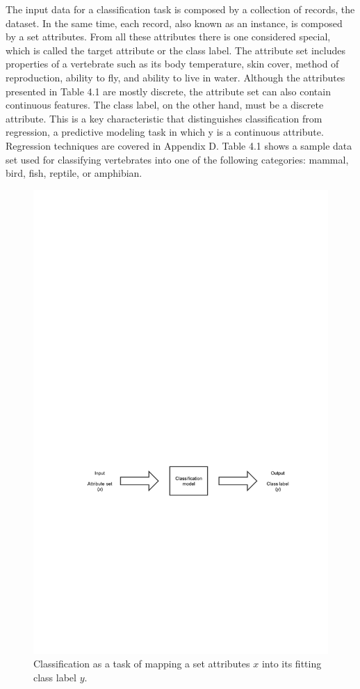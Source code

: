 The input data for a classification task is composed by a collection of records, the dataset. In the same time, each record, also known as an instance, is composed by a set attributes. From all these attributes there is one considered special, which is called the target attribute or the class label. The attribute set includes properties of a vertebrate such as its body temperature, skin cover, method of reproduction, ability to fly, and ability to live in water. Although the attributes presented in Table 4.1 are mostly discrete, the attribute set can also contain continuous features. The class label, on the other hand, must be a discrete attribute. This is a key characteristic that distinguishes classification from regression, a predictive modeling task in which y is a continuous attribute. Regression techniques are covered in Appendix D.
Table 4.1 shows a sample data set used for classifying vertebrates into one of the following categories: mammal, bird, fish, reptile, or amphibian.

\begin{figure}[!htp]
  \center
  \includegraphics[width=\textwidth]{figures/classification}
  \caption{Classification as a task of mapping a set attributes $x$ into its fitting class label $y$.}
  \label{fig:classification_task}
\end{figure}

